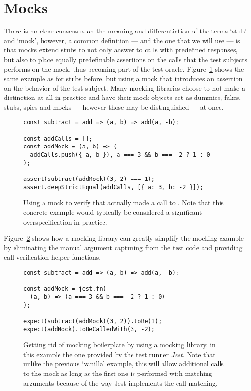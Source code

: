 \section{Mocks}
There is no clear consensus on the meaning and differentiation
of the terms `stub' and `mock', however, a common definition
--- and the one that we will use ---
is that mocks extend stubs to
not only answer to calls with predefined responses,
but also to place equally predefinable assertions on
the calls that the test subjects performs on the mock,
\autocite{MocksArentStubs}
thus becoming part of the test oracle.
Figure~\ref{fig:Mock} shows the same example as for stubs before,
but using a mock that introduces an assertion
on the behavior of the test subject.
Many mocking libraries choose to
not make a distinction at all in practice
and have their mock objects act as
dummies, fakes, stubs, spies and mocks
--- however those may be distinguished --- at once.
\autocite{SpockFrameworkDoc}\autocite{JestMockFunctions}

\begin{figure}
  \begin{verbatim}
const subtract = add => (a, b) => add(a, -b);

const addCalls = [];
const addMock = (a, b) => (
  addCalls.push({ a, b }), a === 3 && b === -2 ? 1 : 0
);

assert(subtract(addMock)(3, 2) === 1);
assert.deepStrictEqual(addCalls, [{ a: 3, b: -2 }]);
  \end{verbatim}
  \caption{
    Using a mock to verify that 
    actually made a call to .
    Note that this concrete example would typically be considered
    a significant overspecification in practice.
  }\label{fig:Mock}
\end{figure}

Figure~\ref{fig:MockLibrary} shows how a mocking library
can greatly simplify the mocking example
by eliminating the manual argument capturing from the test code
and providing call verification helper functions.

\begin{figure}
  \begin{verbatim}
const subtract = add => (a, b) => add(a, -b);

const addMock = jest.fn(
  (a, b) => (a === 3 && b === -2 ? 1 : 0)
);

expect(subtract(addMock)(3, 2)).toBe(1);
expect(addMock).toBeCalledWith(3, -2);
  \end{verbatim}
  \caption{
    Getting rid of mocking boilerplate by using a mocking library,
    in this example the one provided by the test runner \textit{Jest}.
    \autocite{JestGithub}
    Note that unlike the previous `vanilla' example,
    this will allow additional calls to the mock
    as long as the first one is performed with matching arguments
    because of the way Jest implements the call matching.
  }\label{fig:MockLibrary}
\end{figure}
